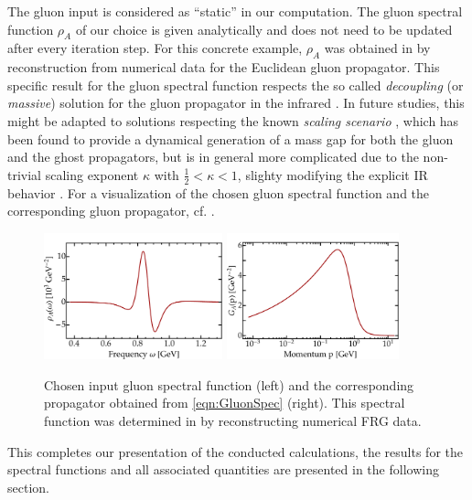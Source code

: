 The gluon input is considered as \enquote{static} in our computation. The gluon spectral function $\rho_A$ of our choice is given analytically and does not need to be updated after every iteration step. For this concrete example, $\rho_A$ was obtained in \cite{CyrolPawlowskiRothkopWink2018} by reconstruction from numerical data for the Euclidean gluon propagator. This specific result for the gluon spectral function respects the so called \textit{decoupling} (or \textit{massive}) solution for the gluon propagator in the infrared \cite{vonSmekalAlkoferHauck1997}. In future studies, this might be adapted to solutions respecting the known \textit{scaling scenario} \cite{LercheVonSmekal2002}, which has been found to provide a dynamical generation of a mass gap for both the gluon and the ghost propagators, but is in general more complicated due to the non-trivial scaling exponent $\kappa$ with $\frac{1}{2}<\kappa < 1$, slighty modifying the explicit IR behavior .
For a visualization of the chosen gluon spectral function and the corresponding gluon propagator, cf. .
\begin{figure}[t]
\hfill
	\centering
	\includegraphics[width = 0.46\textwidth, trim= 4em 0 0 0]{figs/plots/GluonSpecFuncPlot}
\hfill
	\includegraphics[width = 0.445\textwidth, trim= 4em 0 0 0]{figs/plots/GluonPropPlot}
\hfill
	\caption[Chosen input gluon spectral function and corresponding propagator.]{Chosen input gluon spectral function (left) and the corresponding propagator obtained from \eqref{eqn:GluonSpec} (right). This spectral function was determined in \cite{CyrolPawlowskiRothkopWink2018} by reconstructing numerical FRG data.}
\label{fig:gluon_specfunc_and_prop}
\end{figure}
This completes our presentation of the conducted calculations, the results for the spectral functions and all associated quantities are presented in the following section.


